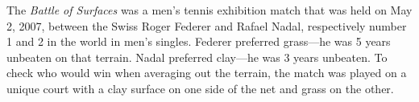 The \emph{Battle of Surfaces} was a men's tennis exhibition match that was held on May 2, 2007, between the Swiss Roger Federer and Rafael Nadal, respectively
number 1 and 2 in the world in men's singles.
Federer preferred grass---he was 5 years unbeaten on that terrain.
Nadal preferred clay---he was 3 years unbeaten.
To check who would win when averaging out the terrain, the match was played on a unique court with a clay surface on one side of the net and grass on the other.
